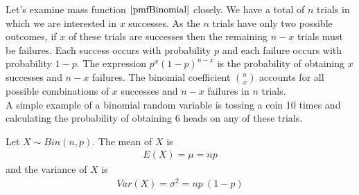 Let's examine mass function $\ref{pmfBinomial}$ closely. 
We have a total of $n$ trials in which we are interested in $x$ successes. 
As the $n$ trials have only two possible outcomes, if $x$ of these trials are successes 
then the remaining $n-x$ trials must be failures. 
Each success occurs with probability $p$ and each failure occurs with probability $1-p$.
The expression $p^{x} (1 - p)^{n - x}$ is the probability of obtaining $x$ successes and $n-x$ failures. 
The binomial coefficient ${n \choose x}$ accounts for all possible combinations of $x$ successes and $n-x$ failures in $n$ trials.\\

A simple example of a binomial random variable is tossing a coin 10 times and calculating the probability of obtaining 6 heads on any of these trials.

\begin{definition}
Let $X \sim Bin(n,p)$.
The mean of $X$ is
	\begin{align}
	E(X) = \mu = np
	\end{align}
and the variance of $X$ is
	\begin{align}
	Var(X) = \sigma^{2} = np~(1-p)
	\end{align}
\end{definition}


